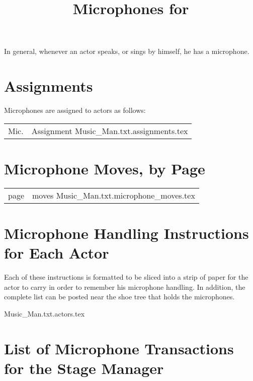 \documentclass[letterpaper]{article}
\title{Microphones for {\ParameterShowName}}
\author{\ParameterDesigner}
\date{\ParameterDateNumeric}
\begin{document}
\maketitle
\tableofcontents
\newpage

In general, whenever an actor speaks, or sings by himself, he has a microphone.

\section {Assignments}
Microphones are assigned to actors as follows:

\begin{center}
\begin{longtable}{|l|m{7in}|}
\hline Mic. & Assignment \endhead \hline
 {Music_Man.txt.assignments.tex}
\end{longtable}
\end{center}

\section {Microphone Moves, by Page}

\begin{center}
\begin{longtable}{|l|m{7in}|}
\hline page & moves \endhead \hline
 {Music_Man.txt.microphone_moves.tex}
\end{longtable}
\end{center}

\section {Microphone Handling Instructions for Each Actor}

Each of these instructions is formatted to be sliced into a strip of paper
for the actor to carry in order to remember his microphone handling.
In addition, the complete list can be posted near the shoe tree that
holds the microphones.

\vskip 0.25in
{\setlength{\parindent}{0in}
 {Music_Man.txt.actors.tex}
}

\section {List of Microphone Transactions for the Stage Manager}
\end{document}
